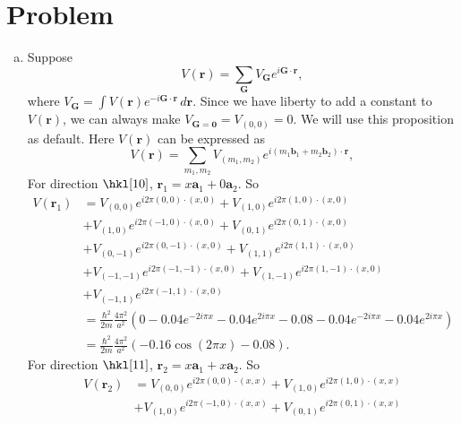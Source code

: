 \documentclass[12pt]{article}
\newcommand*{\RMN}[1]{\uppercase\expandafter{\romannumeral#1}}
\begin{document}
\section*{Problem \RMN{1}}
\begin{enumerate}[(a)]
	\item
	      Suppose
	      \begin{equation}
	      	V(\bm{r}) = \sum_{\bm{G}} V_{\bm{G}} e^{i\bm{G}\cdot \bm{r}},
	      \end{equation}
	      where $V_{\bm{G}} = \int V(\bm{r})e^{-i\bm{G}\cdot\bm{r}} \, d\bm{r}$. Since we have liberty to add a constant to $V(\bm{r})$, we can always make $V_{\bm{G}=\bm{0}} = V_{(0,0)}=0$. We will use this proposition as default.
	      Here $V(\bm{r})$ can be expressed as
	      \begin{equation}
	      	V(\bm{r}) = \sum_{m_1, m_2} V_{(m_1, m_2)} e^{i (m_1 \bm{b}_1 + m_2 \bm{b}_2) \cdot \bm{r}},
	      \end{equation}
	      For direction $\hkl[1 0]$, $\bm{r}_1 = x\bm{a}_1 + 0\bm{a}_2$.
	      So
	      \begin{equation}
	      	\begin{split}
	      		V(\bm{r}_1) &= V_{(0,0)} e^{i 2\pi (0,0)\cdot (x,0)}  + V_{(1,0)} e^{i 2\pi (1,0)\cdot (x,0)} \\
	      		&+ V_{(1,0)} e^{i 2\pi (-1, 0)\cdot (x,0)} + V_{(0, 1)} e^{i 2\pi (0, 1)\cdot (x,0)} \\
	      		&+ V_{(0, -1)} e^{i 2\pi (0, -1)\cdot (x,0)} + V_{(1,1)} e^{i 2\pi (1, 1)\cdot (x,0)}\\
	      		&+ V_{(-1,-1)} e^{i 2\pi (-1, -1)\cdot (x,0)} + V_{(1,-1)} e^{i 2\pi (1,-1)\cdot (x,0)} \\
	      		&+ V_{(-1,1)} e^{i 2\pi (-1,1)\cdot (x,0)} \\
	      		&= \frac{\hbar^2}{2m}\frac{4\pi^2}{a^2}(0 -0.04 e^{-2 i \pi  x}-0.04 e^{2 i \pi  x}-0.08 -0.04 e^{-2 i \pi  x}-0.04 e^{2 i \pi  x})\\
	      		&= \frac{\hbar^2}{2m}\frac{4\pi^2}{a^2}(-0.16 \cos (2 \pi  x)-0.08).
	      	\end{split}
	      \end{equation}
	      For direction $\hkl[1 1]$, $\bm{r}_2 = x\bm{a}_1 + x\bm{a}_2$. So
	      \begin{equation}
	      	\begin{split}
	      		V(\bm{r}_2) &=  V_{(0,0)} e^{i 2\pi (0,0)\cdot (x,x)}  + V_{(1,0)} e^{i 2\pi (1,0)\cdot (x,x)} \\
	      		&+ V_{(1,0)} e^{i 2\pi (-1, 0)\cdot (x,x)} + V_{(0, 1)} e^{i 2\pi (0, 1)\cdot (x,x)} \\

\end{split}
\end{equation}
\end{enumerate}
\end{document}
